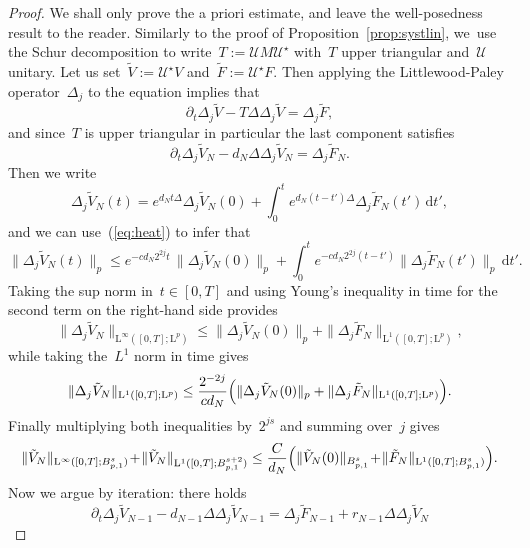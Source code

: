 \documentclass[JEP,XML,SOM,Unicode,published]{cedram}
\theoremstyle{definition}
\newcommand\dd{\mathrm{d}}
\renewcommand\L{\mathrm{L}}
\begin{document}
\begin{proof}
We shall only prove the a priori estimate, and leave the well-posedness result to the reader. Similarly to the proof of Proposition~\ref{prop:systlin}, we~use the Schur decomposition to write~$T:= \mathcal U M \mathcal U^\star$ with~$ T$ upper triangular and~$\mathcal U$ unitary.
Let us set~$\tilde V:= \mathcal U^\star V$ and~$\tilde F:= \mathcal U^\star F$. Then applying the Littlewood-Paley operator~$\Delta_j $ to the equation implies that\vspace*{-3pt}
\[
\partial_t \Delta_j \tilde V-T \Delta\Delta_j \tilde V = \Delta_j\tilde F,
\]
and since~$T$ is upper triangular in particular the last component satisfies\vspace*{-3pt}
\[
\partial_t \Delta_j \tilde V_N -d_N \Delta\Delta_j \tilde V_N = \Delta_j\tilde F_N.
\]
Then we write\vspace*{-3pt}\enlargethispage{.5\baselineskip}
\[
\Delta_j \tilde V_N(t) = e^{d_Nt \Delta}\Delta_j \tilde V_N(0) + \int_0^t e^{d_N(t-t') \Delta}\Delta_j \tilde F_N(t') \, \dd t',
\]
and we can use~(\ref{eq:heat}) to infer that\vspace*{-3pt}
\[
\| \Delta_j \tilde V_N(t)\|_p \leq e^{- cd_N2^{2j}t }\,\| \Delta_j \tilde V_N(0)\|_p + \int_0^t e^{- cd_N2^{2j}(t-t') }\| \Delta_j\tilde F_N(t')\|_p \,\dd t'.
\]
Taking the sup norm in~$t \in [0,T]$ and using Young's inequality in time for the second term on the right-hand side provides\vspace*{-3pt}
\[
\| \Delta_j \tilde V_N \|_{\L^\infty([0,T];\L^p)} \leq \| \Delta_j \tilde V_N(0)\|_p + \|\Delta_j\tilde F_N \|_{\L^1([0,T];\L^p)},
\]
while taking the~$L^1$ norm in time gives\vspace*{-3pt}
\[
\| \Delta_j \tilde V_N \|_{\L^1([0,T];\L^p)} \leq \frac {2^{-2j}}{c d_N} \Bigl(\| \Delta_j \tilde V_N(0)\|_p + \|\Delta_j\tilde F_N \|_{\L^1([0,T];\L^p)}\Bigr).
\]
Finally multiplying both inequalities by~$2^{js} $ and summing over~$j$ gives\vspace*{-3pt}
\begin{equation}
\label{eq: VN}
\| \tilde V_N \|_{\L^\infty([0,T];B^s_{p,1})} \!+\! \| \tilde V_N \|_{\L^1([0,T];B^{s+2}_{p,1})} \leq \frac C {d_N} \Bigl(\| \tilde V_N (0)\|_{B^s_{p,1}} \!+\! \| \tilde F_N \|_{\L^1([0,T];B^s_{p,1})} \Bigr).
\end{equation}
Now we argue by iteration: there holds\vspace*{-3pt}
\[
\partial_t \Delta_j \tilde V_{N-1} - d_{N-1} \Delta\Delta_j \tilde V_{N-1} = \Delta_j\tilde F_{N-1} + r_{N-1}\Delta \Delta_j \tilde V_{N }
\]
\end{proof}
\end{document}

